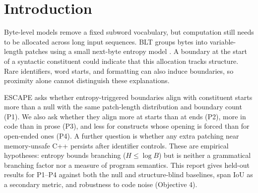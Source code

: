 \begin{abstract}
We investigate whether entropy-triggered boundaries in the Byte Latent Transformer (BLT) align with syntactic constituent starts beyond a density-matched null. Project ESCAPE compares Python, C++, and English prose. We restore the patcher's 512-byte sliding window, extract entropies for all \nSamples{} files, freeze the matching tolerance on a calibration split, and score the held-out split with one-to-one matching against \nPerm{} permutations of each file's own patch lengths. Held-out start F1 \POneAll{} (Python \FonePy{} vs.\ \FoneNullPy{}; C++ \FoneCpp{} vs.\ \FoneNullCpp{}; English \FoneEn{} vs.\ \FoneNullEn{}). Against the strongest structure-blind baseline (indentation or word starts), however, BLT \RTwoAll{}. By constituent type, forced-opener constructs such as \texttt{if} and \texttt{def} align more strongly than open-ended ones, contrary to our prediction. Under injected code noise, alignment degrades only slightly, while noise lowers bytes per patch. Entropy is a surface statistic, and none of these results is evidence of semantic understanding.
\end{abstract}

\section{Introduction}
Byte-level models remove a fixed subword vocabulary, but computation still needs to be allocated across long input sequences. BLT groups bytes into variable-length patches using a small next-byte entropy model \citep{pagnoni-etal-2025-byte}. A boundary at the start of a syntactic constituent could indicate that this allocation tracks structure. Rare identifiers, word starts, and formatting can also induce boundaries, so proximity alone cannot distinguish these explanations.

ESCAPE asks whether entropy-triggered boundaries align with constituent starts more than a null with the same patch-length distribution and boundary count (P1). We also ask whether they align more at starts than at ends (P2), more in code than in prose (P3), and less for constructs whose opening is forced than for open-ended ones (P4). A further question is whether any extra patching near memory-unsafe C++ persists after identifier controls. These are empirical hypotheses: entropy bounds branching ($H\le\log B$) but is neither a grammatical branching factor nor a measure of program semantics. This report gives held-out results for P1--P4 against both the null and structure-blind baselines, span IoU as a secondary metric, and robustness to code noise (Objective 4).

